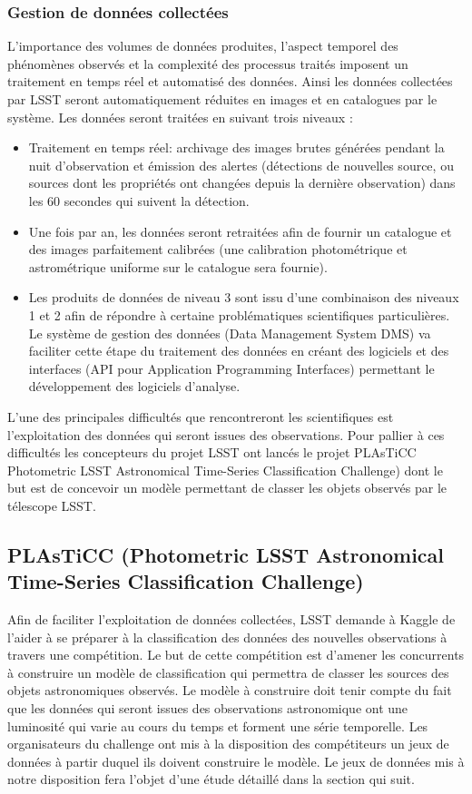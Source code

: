 \subsubsection{Gestion de données collectées}
L'importance des volumes de données produites, l'aspect temporel des phénomènes observés et la complexité des processus traités imposent un traitement en temps réel et automatisé des données. Ainsi les données collectées par LSST seront automatiquement réduites en images et en catalogues par le système. Les données seront traitées en suivant trois niveaux :
\begin{itemize}
    \item Traitement en temps réel: archivage des images brutes générées pendant la nuit d'observation et émission des alertes (détections de nouvelles source, ou sources dont les propriétés ont changées depuis la dernière observation) dans les 60 secondes qui suivent la détection.
    \item Une fois par an, les données seront retraitées afin de fournir un catalogue et des images parfaitement calibrées (une calibration photométrique et astrométrique uniforme sur le catalogue sera fournie).
    \item Les produits de données de niveau 3 sont issu d'une combinaison des niveaux 1 et 2 afin de répondre à certaine problématiques scientifiques particulières. Le système de gestion des données (Data Management System DMS) va faciliter cette étape du traitement des données en créant des logiciels et des interfaces (API pour Application Programming Interfaces) permettant le développement des logiciels d'analyse.
\end{itemize}

L’une des principales difficultés que rencontreront les scientifiques est l’exploitation des données qui seront issues des observations.
Pour pallier à ces difficultés les concepteurs du projet LSST ont lancés le projet PLAsTiCC  Photometric LSST Astronomical Time-Series Classification Challenge) dont le but est de concevoir un modèle permettant de classer les objets observés par le télescope LSST.

\subsection{PLAsTiCC  (Photometric LSST Astronomical Time-Series Classification Challenge)}
Afin de faciliter l’exploitation de données collectées, LSST demande à Kaggle de l’aider à se préparer à la classification des données des nouvelles observations à travers une compétition. 
Le but de cette compétition est d’amener les concurrents  à construire un modèle de  classification qui permettra de classer  les sources  des objets astronomiques observés. 
Le modèle à construire doit tenir compte du fait que les données qui seront issues des observations astronomique ont une luminosité qui varie au cours du temps et forment une série temporelle.
Les organisateurs du challenge ont mis à la disposition des compétiteurs un jeux de données à partir duquel ils doivent construire le modèle.
Le jeux de données mis à notre disposition fera l’objet d’une étude détaillé dans la section qui suit.


